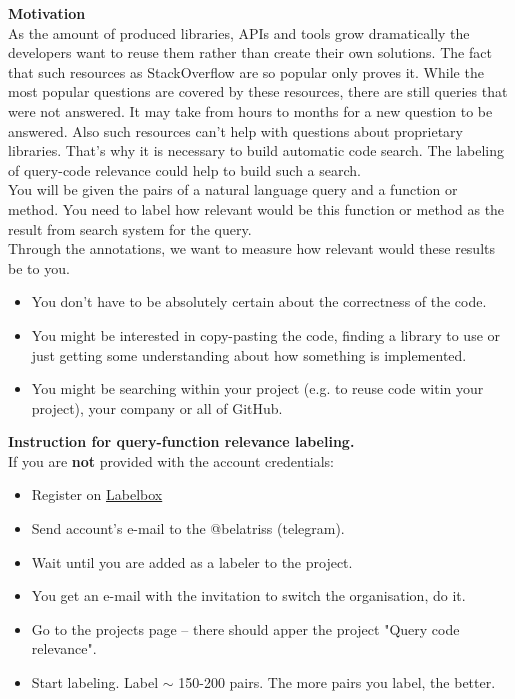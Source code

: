 \documentclass[12 pt]{article}
\begin{document}
{\bf \Large Motivation} \\

As the amount of produced libraries, APIs and tools grow dramatically the developers want to reuse them rather than create their own solutions. The fact that such resources as StackOverflow are so popular only proves it.
While the most popular questions are covered by these resources, there are still queries that were not answered. It may take from hours to months for a new question to be answered. Also such resources can’t help with questions about proprietary libraries. That’s why it is necessary to build automatic code search. The labeling of query-code relevance could help to build such a search. \\

You will be given the pairs of a natural language query and a function or method. You need to label how relevant would be this function or method as the result from search system for the query. \\

Through the annotations, we want to measure how relevant would these results be to you. 

\begin{itemize}
	\item You don't have to be absolutely certain about the correctness of the code.
	\item You might be interested in copy-pasting the code, finding a library to use or just getting some understanding about how something is implemented.
	\item You might be searching within your project (e.g. to reuse code witin your project), your company or all of GitHub.
\end{itemize}

{\bf \Large Instruction for query-function relevance labeling. }  \\

If you are {\bf not} provided with the account credentials:
\begin{itemize}
	\item Register on \href{https://labelbox.com}{Labelbox}
	\item Send account's e-mail to the @belatriss (telegram). 
	\item Wait until you are added as a labeler to the project.
	\item You get an e-mail with the invitation to switch the organisation, do it.
	\item Go to the projects page -- there should apper the project "Query code relevance".
	\item Start labeling. Label $\sim$ 150-200 pairs. The more pairs you label, the better.
\end{itemize}
\end{document}
